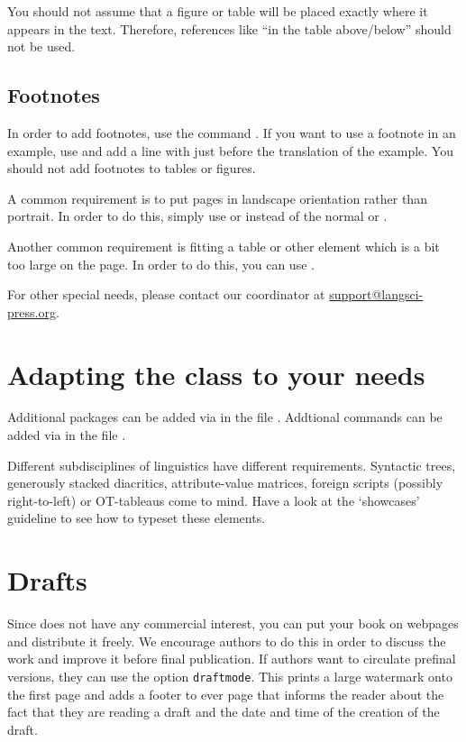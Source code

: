 You should not assume that a figure or table will be placed exactly where it appears in the text. Therefore, references like ``in the table above/below'' should not be used. 

\subsection{Footnotes}
In order to add footnotes, use the command . If you want to use a footnote in an example, use  and add a line with  just before the translation of the example. You should not add footnotes to tables or figures.


A common requirement is to put pages in landscape orientation rather than portrait. In order to do this, simply use  or  instead of the normal  or .

Another common requirement is fitting a table or other element which is a bit too large on the page. In order to do this, you can use .

For other special needs, please contact our coordinator at \url{support@langsci-press.org}. 
\section{Adapting the class to your needs}

Additional packages can be added via  in the file .
Addtional commands can be added via  in the file . 


Different subdisciplines of linguistics have different requirements. Syntactic trees, generously stacked diacritics, attribute-value matrices, foreign scripts (possibly right-to-left) or OT-tableaus come to mind. Have a look at the `showcases' guideline to see how to typeset these elements.


 
   
\section{Drafts}

Since \lsp does not have any commercial interest, you can put your book on webpages and distribute it
freely. We encourage authors to do this in order to discuss the work and improve it before final
publication. If authors want to circulate prefinal versions, they can use the option
\texttt{draftmode}. This prints a large watermark onto the first page and adds a footer to ever page
that informs the reader about the fact that they are reading a draft and the date and time of the
creation of the draft.
  